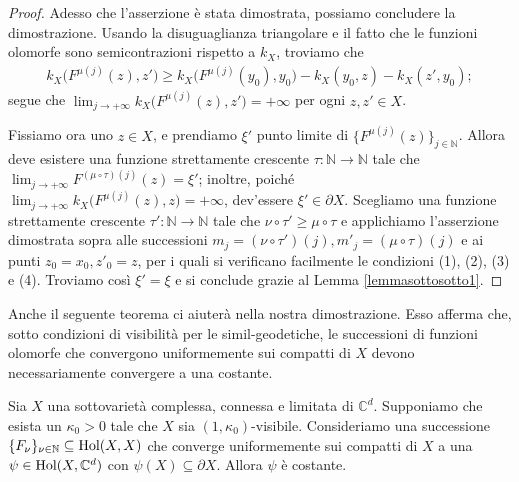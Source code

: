 \begin{proof}
    Adesso che l'asserzione è stata dimostrata, possiamo concludere la dimostrazione. Usando la disuguaglianza triangolare e il fatto che le funzioni olomorfe sono semicontrazioni rispetto a $k_X$, troviamo che
    \begin{gather*}
        k_X\big(F^{\mu(j)}(z),z'\big) \ge k_X\big(F^{\mu(j)}(y_0),y_0\big)-k_X(y_0,z)-k_X(z',y_0);
    \end{gather*}
    segue che $\displaystyle\lim_{j\longrightarrow+\infty}k_X\big(F^{\mu(j)}(z),z'\big)=+\infty$ per ogni $z,z' \in X$.

     Fissiamo ora uno $z\in X$, e prendiamo $\xi'$ punto limite di $\{F^{\mu(j)}(z)\}_{j\in\mathbb{N}}$. Allora deve esistere una funzione strettamente crescente $\tau:\mathbb{N}\longrightarrow\mathbb{N}$ tale che $\displaystyle \lim_{j\longrightarrow+\infty} F^{(\mu\circ\tau)(j)}(z)=\xi'$; inoltre, poiché $\displaystyle\lim_{j\longrightarrow+\infty}k_X\big(F^{\mu(j)}(z),z\big)=+\infty$, dev'essere $\xi'\in\partial X$. Scegliamo una funzione strettamente crescente $\tau':\mathbb{N}\longrightarrow\mathbb{N}$ tale che $\nu\circ\tau' \ge \mu\circ\tau$ e applichiamo l'asserzione dimostrata sopra alle successioni $m_j=(\nu\circ\tau')(j), m'_j=(\mu\circ\tau)(j)$ e ai punti $z_0=x_0,z'_0=z$, per i quali si verificano facilmente le condizioni (1), (2), (3) e (4). Troviamo così $\xi'=\xi$ e si conclude grazie al Lemma \ref{lemmasottosotto1}.
\end{proof}

Anche il seguente teorema ci aiuterà nella nostra dimostrazione. Esso afferma che, sotto condizioni di visibilità per le simil-geodetiche, le successioni di funzioni olomorfe che convergono uniformemente sui compatti di $X$ devono necessariamente convergere a una costante.

\begin{thm} \label{lim_is_const}
    Sia $X$ una sottovarietà complessa, connessa e limitata di $\mathbb{C}^d$. Supponiamo che esista un $\kappa_0>0$ tale che $X$ sia $(1,\kappa_0)$-visibile. Consideriamo una successione $\{F_\nu\}_{\nu\in\mathbb{N}} \subseteq \textnormal{Hol}(X,X)$ che converge uniformemente sui compatti di $X$ a una $\psi\in\textnormal{Hol}(X,\mathbb{C}^d)$ con $\psi(X)\subseteq\partial X$. Allora $\psi$ è costante.
\end{thm}

